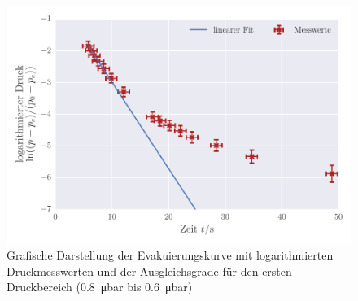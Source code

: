 \begin{figure}[!h]
 \centering
 \includegraphics[scale=0.8]{../Grafiken/Evakuierungskurve_Turbo_log_0.pdf}
 \caption{Grafische Darstellung der Evakuierungskurve mit logarithmierten Druckmesswerten und der Ausgleichsgrade für den ersten Druckbereich (\SI{0.8}{\micro\bar} bis \SI{0.6}{\micro\bar})\label{fig:evakuierungskurve_turbo_log_0}}
 \end{figure} 